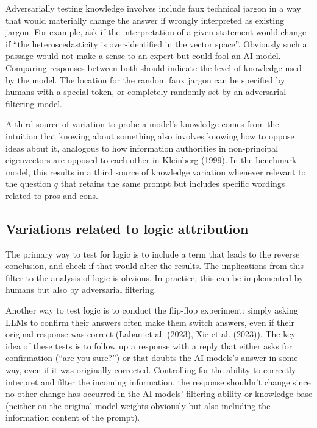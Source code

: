 \documentclass[
]{article}
\begin{document}
Adversarially testing knowledge involves include faux technical jargon
in a way that would materially change the answer if wrongly interpreted
as existing jargon. For example, ask if the interpretation of a given
statement would change if ``the heteroscedasticity is over-identified in
the vector space''. Obviously such a passage would not make a sense to
an expert but could fool an AI model. Comparing responses between both
should indicate the level of knowledge used by the model. The location
for the random faux jargon can be specified by humans with a special
token, or completely randomly set by an adversarial filtering model.

A third source of variation to probe a model's knowledge comes from the
intuition that knowing about something also involves knowing how to
oppose ideas about it, analogous to how information authorities in
non-principal eigenvectors are opposed to each other in Kleinberg
(1999). In the benchmark model, this results in a third source of
knowledge variation whenever relevant to the question \(q\) that retains
the same prompt but includes specific wordings related to pros and cons.

\subsection{Variations related to logic
attribution}\label{variations-related-to-logic-attribution}

The primary way to test for logic is to include a term that leads to the
reverse conclusion, and check if that would alter the results. The
implications from this filter to the analysis of logic is obvious. In
practice, this can be implemented by humans but also by adversarial
filtering.

Another way to test logic is to conduct the flip-flop experiment: simply
asking LLMs to confirm their answers often make them switch answers,
even if their original response was correct (Laban et al. (2023), Xie et
al. (2023)). The key idea of these tests is to follow up a response with
a reply that either asks for confirmation (``are you sure?'') or that
doubts the AI models's answer in some way, even if it was originally
corrected. Controlling for the ability to correctly interpret and filter
the incoming information, the response shouldn't change since no other
change has occurred in the AI models' filtering ability or knowledge
base (neither on the original model weights obviously but also including
the information content of the prompt).
\end{document}

